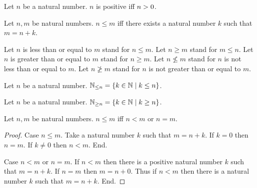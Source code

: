 \documentclass[../arithmetic.tex]{subfiles}
\begin{document}
  \begin{forthel}
    \begin{definition}
      Let $n$ be a natural number.
      $n$ is positive iff $n > 0$.
    \end{definition}
  \end{forthel}

  \begin{forthel}
    \begin{definition}
      Let $n, m$ be natural numbers.
      $n \leq m$ iff there exists a natural number $k$ such that $m = n \plus k$.
    \end{definition}

    Let $n$ is less than or equal to $m$ stand for $n \leq m$.
    Let $n \geq m$ stand for $m \leq n$.
    Let $n$ is greater than or equal to $m$ stand for $n \geq m$.
    Let $n \nleq m$ stand for $n$ is not less than or equal to $m$.
    Let $n \ngeq m$ stand for $n$ is not greater than or equal to $m$.
  \end{forthel}

  \begin{forthel}
    \begin{definition}
      Let $n$ be a natural number.
      $\mathbb{N}_{\leq n} = \{ k \in \mathbb{N} \mid k \leq n \}$.
    \end{definition}
  \end{forthel}

  \begin{forthel}
    \begin{definition}
      Let $n$ be a natural number.
      $\mathbb{N}_{\geq n} = \{ k \in \mathbb{N} \mid k \geq n \}$.
    \end{definition}
  \end{forthel}

  \begin{forthel}
    \begin{proposition}
      Let $n, m$ be natural numbers.
      $n \leq m$ iff $n \less m$ or $n = m$.
    \end{proposition}
    \begin{proof}
      Case $n \leq m$.
        Take a natural number $k$ such that $m = n \plus k$.
        If $k = 0$ then $n = m$. If $k \neq 0$ then $n \less m$.
      End.

      Case $n \less m$ or $n = m$.
        If $n \less m$ then there is a positive natural number $k$ such that
        $m = n \plus k$.
        If $n = m$ then $m = n \plus 0$.
        Thus if $n \less m$ then there is a natural number $k$ such that
        $m = n \plus k$.
      End.
    \end{proof}
  \end{forthel}
\end{document}
